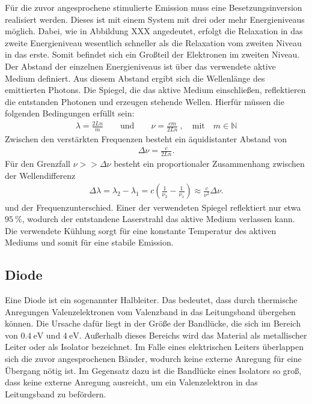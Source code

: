 Für die zuvor angesprochene stimulierte Emission muss eine Besetzungsinversion realisiert werden. Dieses ist mit einem System mit drei oder mehr Energieniveaus möglich. Dabei, wie in Abbildung XXX angedeutet, erfolgt die Relaxation in das zweite Energieniveau wesentlich schneller als die Relaxation vom zweiten Niveau in das erste. Somit befindet sich ein Großteil der Elektronen im zweiten Niveau. Der Abstand der einzelnen Energieniveaus ist über das verwendete aktive Medium definiert. Aus diesem Abstand ergibt sich die Wellenlänge des emittierten Photons. Die Spiegel, die das aktive Medium einschließen, reflektieren die entstanden Photonen und erzeugen stehende Wellen. Hierfür müssen die folgenden Bedingungen erfüllt sein:
\begin{align}
	\lambda=\frac{2Ln}{m}\qquad \text{und} \qquad\nu=\frac{cm}{2Ln}\:, \quad \text{mit}  \quad m \in \mathbb{N} 
\end{align}
Zwischen den verstärkten Frequenzen besteht ein äquidistanter Abstand von
\begin{align}
	\Delta \nu=\frac{c}{2Ln}.
\end{align}
Für den Grenzfall $\nu >>\Delta\nu$ besteht ein proportionaler Zusammenhang zwischen der Wellendifferenz
\begin{align}
	\Delta \lambda =\lambda_2- \lambda_1=c\left(\frac{1}{\nu_2}-\frac{1}{\nu_1}\right) \approx \frac{c}{\nu^2}\Delta\nu.
\end{align}
und der Frequenzunterschied. Einer der verwendeten Spiegel reflektiert nur etwa $\SI{95}{\percent}$, wodurch der entstandene Laserstrahl das aktive Medium verlassen kann. Die verwendete Kühlung sorgt für eine konstante Temperatur des aktiven Mediums und somit für eine stabile Emission.

\subsection{Diode}

Eine Diode ist ein sogenannter Halbleiter. Das bedeutet, dass durch thermische Anregungen Valenzelektronen vom Valenzband in das Leitungsband übergehen können. Die Ursache dafür liegt in der Größe der Bandlücke, die sich im Bereich von $\SI{0.4}{\electronvolt}$ und  $\SI{4}{\electronvolt}$. Außerhalb dieses Bereichs wird das Material als metallischer Leiter oder als Isolator bezeichnet. Im Falle eines elektrischen Leiters überlappen sich die zuvor angesprochenen Bänder, wodurch keine externe Anregung für eine Übergang nötig ist. Im Gegensatz dazu ist die Bandlücke eines Isolators so groß, dass keine externe Anregung ausreicht, um ein Valenzelektron in das Leitungsband zu befördern. 


